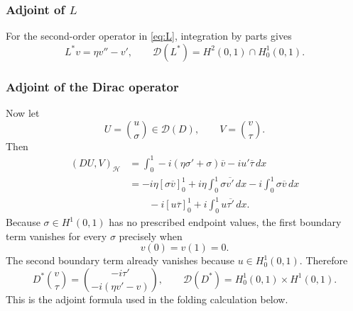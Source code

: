 \documentclass[12pt,a4paper]{article}
\newcommand{\D}{\mathcal{D}}
\newcommand{\IP}[2]{\left(#1,#2\right)_{\mathcal H}}
\begin{document}
\subsubsection{Adjoint of $L$}

For the second-order operator in \eqref{eq:L}, integration by parts gives
\begin{equation}
    L^*v=\eta v''-v',
    \qquad
    \D(L^*)=H^2(0,1)\cap H_0^1(0,1).
    \label{eq:Ladjoint}
\end{equation}

\subsubsection{Adjoint of the Dirac operator}

Now let
\[
    U=\binom{u}{\sigma}\in\D(D),
    \qquad
    V=\binom{v}{\tau}.
\]
Then
\begin{align*}
    \IP{DU}{V}
    &=\int_0^1
       -i(\eta\sigma'+\sigma)\overline v
       -iu'\overline\tau\,dx\\
    &=-i\eta[\sigma\overline v]_0^1
      +i\eta\int_0^1\sigma\overline{v'}\,dx
      -i\int_0^1\sigma\overline v\,dx\\
    &\qquad
      -i[u\overline\tau]_0^1
      +i\int_0^1u\overline{\tau'}\,dx.
\end{align*}
Because $\sigma\in H^1(0,1)$ has no prescribed endpoint values, the first boundary term vanishes for every $\sigma$ precisely when
\[
    v(0)=v(1)=0.
\]
The second boundary term already vanishes because $u\in H_0^1(0,1)$.  Therefore
\begin{equation}
    D^*\binom{v}{\tau}
    =
    \binom{-i\tau'}{-i(\eta v'-v)},
    \qquad
    \D(D^*)=H_0^1(0,1)\times H^1(0,1).
    \label{eq:Dadjoint}
\end{equation}
This is the adjoint formula used in the folding calculation below.


\end{document}
